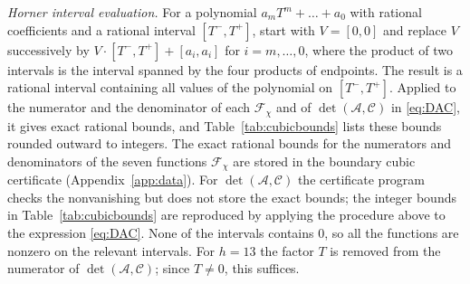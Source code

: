 \documentclass{amsart}
\theoremstyle{definition}
\theoremstyle{remark}
\numberwithin{equation}{section}
\begin{document}
\emph{Horner interval evaluation.} For a polynomial $a_mT^m+\dots+a_0$ with rational
coefficients and a rational interval $[T^-,T^+]$, start with $V=[0,0]$ and replace $V$
successively by $V\cdot[T^-,T^+]+[a_i,a_i]$ for $i=m,\dots,0$, where the product of two
intervals is the interval spanned by the four products of endpoints. The result is a
rational interval containing all values of the polynomial on $[T^-,T^+]$. Applied to the
numerator and the denominator of each $\mathcal F_\chi$ and of $\det(\mathcal A,\mathcal C)$
in \eqref{eq:DAC}, it gives exact rational bounds, and Table~\ref{tab:cubicbounds} lists
these bounds rounded outward to integers. The exact rational bounds for the numerators and
denominators of the seven functions $\mathcal F_\chi$ are stored in the boundary cubic
certificate (Appendix~\ref{app:data}). For $\det(\mathcal A,\mathcal C)$ the certificate
program checks the nonvanishing but does not store the exact bounds; the integer bounds in
Table~\ref{tab:cubicbounds} are reproduced by applying the procedure above to the
expression \eqref{eq:DAC}. None of the
intervals contains $0$, so all the functions are nonzero on the relevant intervals. For
$h=13$ the factor $T$ is removed from the numerator of $\det(\mathcal A,\mathcal C)$; since
$T\ne0$, this suffices.
\end{document}
